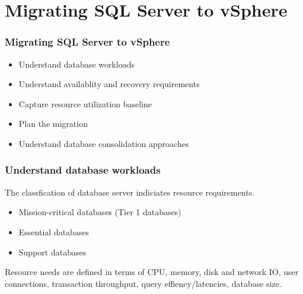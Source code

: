 \documentclass[CJK]{beamer}
\begin{document}
\section{Migrating SQL Server to vSphere}
\begin{frame}[t]
    \frametitle{Migrating SQL Server to vSphere}
    \begin{itemize}
        \item Understand database workloads
        \item Understand availablity and recovery requirements
        \item Capture resource utilization baseline
        \item Plan the migration
        \item Understand database consolidation approaches
    \end{itemize}
\end{frame}

\begin{frame}[t]
    \frametitle{Understand database workloads}
    The classfication of database server indiciates resource requirements.
    \begin{itemize}
        \item Mission-critical databases (Tier 1 databases)
        \item Essential databases
        \item Support databases
    \end{itemize}
    Resource needs are defined in terms of CPU, memory, disk and network IO, user connections, transaction throughput, query effiency/latencies, database size.
\end{frame}
\end{document}
